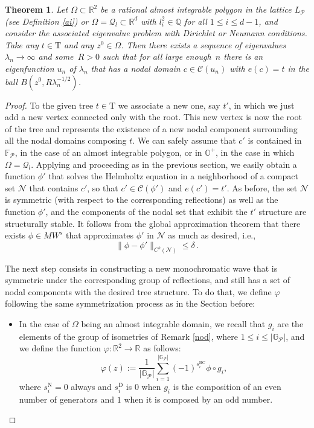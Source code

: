 \documentclass{amsart}
\newtheorem{theorem}{Theorem}[section]
\theoremstyle{definition}
\theoremstyle{remark}
\newcommand{\la}{\lambda}
\renewcommand\leq\leqslant
\numberwithin{equation}{section}
\theoremstyle{definition}
\theoremstyle{remark}
\begin{document}
\begin{theorem}\label{Yaiz}
	Let $\Omega\subset\mathbb{R}^{2}$ be a rational almost integrable polygon in the lattice $L_\mathcal{P}$ (see Definition \ref{ai})  or $\Omega=\mathcal{Q}_l\subset\mathbb{R}^{d}$ with $ l_i^2\in \mathbb{Q}$ for all $1\leq i\leq d-1$, and consider the associated eigenvalue problem  with Dirichlet or Neumann conditions. Take any $t\in\mathrm{T}$ and any  $z^0\in\Omega$. Then there exists a sequence of eigenvalues $\la_n\to\infty$ and  some~$R>0$ such that for all large enough~$n$ there is an eigenfunction $u_n$ of $\lambda_n$ that has a nodal domain $c\in\mathcal{C}\left(u_n\right)$ with $e(c)=t$ in the ball $B\left(z^0,R\la_n^{-1/2}\right)$.
\end{theorem}
\begin{proof}
	 To the given tree $t\in\mathrm{T}$ we associate a new one, say $t'$, in which we just add a new vertex connected only with the root. This new vertex is now the root of the tree and represents the existence of a new nodal component surrounding all the nodal domains composing $t$. We can safely assume that $c'$ is contained in $\mathbb{F}_{\mathcal{P}}$, in the case of an almost integrable polygon, or in $\mathbb{O}^+$, in the case in which $\Omega=\mathcal{Q}_l$. Applying \cite[Theorem 2]{Yaiza} and proceeding as in the previous section, we easily obtain a function $\phi'$ that solves the Helmholtz equation in a neighborhood of a compact set $\mathcal N$ that contains $c'$, so that $c'\in\mathcal{C}\left(\phi'\right)$ and $e(c')=t'$. As before, the set $\mathcal N$ is symmetric (with respect to the corresponding reflections) as well as the function $\phi'$, and the components of the nodal set that exhibit the $t'$ structure are structurally stable. It follows from the global approximation theorem that there exists $\phi\in MW^s$ that approximates $\phi'$ in $\mathcal N$ as much as desired, i.e.,
\begin{equation}
\|\phi-\phi'\|_{C^k(\mathcal N)}\leq \delta\,.
\end{equation}
	 
	
    The next step consists in constructing a new monochromatic wave that is symmetric under the corresponding group of reflections, and still has a set of nodal components with the desired tree structure. To do that, we define $\varphi$ following the same symmetrization process as in the Section before: \begin{itemize}
	 	\item In the case of $\Omega$ being an almost integrable domain, we recall that $g_i$ are the elements of the group of isometries of Remark \ref{nod}, where $1\leq i\leq \left|\mathbb{G}_\mathcal{P}\right|$, and we define the function $\varphi:\mathbb{R}^2\rightarrow\mathbb{R}$ as follows: \begin{equation}
	 		\varphi(z):=\frac{1}{\left|\mathbb{G}_\mathcal{P}\right|}\sum_{i=1}^{\left|\mathbb{G}_\mathcal{P}\right|}\left(-1\right)^{s_i^{\mathrm{BC}}}\phi\circ g_i,
	 	\end{equation}where $s_i^{\mathrm{N}}=0$ always and $s_i^{\mathrm{D}}$ is $0$ when $g_i$ is the composition of an even number of generators and $1$ when it is composed by an odd number. 
	 	

\end{itemize}
\end{proof}
\end{document}

